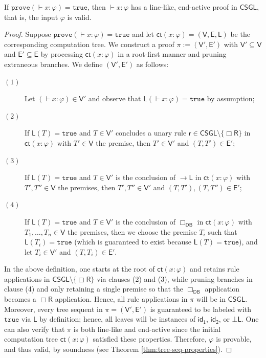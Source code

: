 \documentclass[copyright,creativecommons]{eptcs}
\newcommand{\idi}{\mathsf{id_{1}}}
\newcommand{\idii}{\mathsf{id_{2}}}
\newcommand{\boxr}{\Box\mathsf{R}}
\renewcommand{\phi}{\varphi}
\newcommand{\ctrl}{\mathsf{cL}}
\newcommand{\ctrr}{\mathsf{cR}}
\newcommand{\prf}{\pi}
\newcommand{\ru}{\mathsf{r}}
\newenvironment{customthm}[1]
  {\renewcommand\theinnercustomthm{#1}\innercustomthm}
  {\endinnercustomthm}
\newcommand{\calc}{\mathsf{CSGL}}
\newcommand{\sar}{\vdash}
\newcommand{\tseq}{T} %
\newcommand{\true}{\mathtt{true}}
\newcommand{\prove}{\mathtt{prove}}
\newcommand{\dbr}{\Box_\mathsf{DB}}
\newcommand{\set}[1]{\{#1\}}
\newcommand{\ct}{\mathsf{ct}}
\newcommand{\ctv}{\mathsf{V}}
\newcommand{\cte}{\mathsf{E}}
\newcommand{\ctl}{\mathsf{L}}
\newcommand{\tval}{\true} %
\newcommand{\impl}{{\rightarrow}\mathsf{L}}
\newcommand{\botl}{\bot\mathsf{L}}
\begin{document}
\begin{customthm}{\ref{lem:true-gives-proof}}
If $\prove( \sar x : \phi) = \true$, then $\sar x : \phi$ has a line-like, end-active proof in $\calc$, that is, the input $\phi$ is valid.
\end{customthm}

\begin{proof} Suppose $\prove(\sar x : \phi) = \true$ and let $\ct(x : \phi) = (\ctv,\cte,\ctl)$ be the corresponding computation tree. We construct a proof $\prf := (\ctv',\cte')$ with $\ctv' \subseteq \ctv$ and $\cte' \subseteq \cte$ by processing $\ct(x : \phi)$ in a root-first manner and pruning extraneous branches. We define $(\ctv',\cte')$ as follows:
\begin{description}

\item[$(1)$] Let $( \sar x : \phi) \in \ctv'$ and observe that $\ctl( \sar x : \phi) = \tval$ by assumption;

\item[$(2)$] If $\ctl(\tseq) = \tval$ and $\tseq \in \ctv'$ concludes a unary rule $ \ru \in \calc \setminus \set{\boxr}$ in $\ct(x : \phi)$ with $\tseq' \in \ctv$ the premise, then $\tseq' \in \ctv'$ and $(\tseq,\tseq') \in \cte'$;

\item[$(3)$] If $\ctl(\tseq) = \tval$ and $\tseq \in \ctv'$ is the conclusion of $\impl$ in $\ct(x : \phi)$ with $\tseq', \tseq'' \in \ctv$ the premises, then $\tseq', \tseq'' \in \ctv'$ and $(\tseq,\tseq'), (\tseq,\tseq'') \in \cte'$;

\item[$(4)$] If $\ctl(\tseq) = \tval$ and $\tseq \in \ctv'$ is the conclusion of $\dbr$ in $\ct(x : \phi)$ with $\tseq_{1}, \ldots, \tseq_{n} \in \ctv$ the premises, then we choose the premise $\tseq_{i}$ such that $\ctl(\tseq_{i}) = \tval$ (which is guaranteed to exist because $\ctl(\tseq) = \tval$), and let $\tseq_{i} \in \ctv'$ and $(\tseq,\tseq_{i}) \in \cte'$.

\end{description}
In the above definition, one starts at the root of $\ct(x : \phi)$ and retains rule applications in $\calc \setminus \set{\boxr}$ via clauses (2) and (3), while pruning branches in clause (4) and only retaining a single premise so that the $\dbr$ application becomes a $\boxr$ application. %
Hence, all rule applications in $\prf$ will be in $\calc$. Moreover, every tree sequent in $\prf = (\ctv',\cte')$ is guaranteed to be labeled with $\tval$ via $\ctl$ by definition; hence, all leaves will be instances of $\idi$, $\idii$, or $\botl$. One can also verify that $\prf$ is both line-like and end-active since the initial computation tree $\ct(x : \phi)$ satisfied these properties. %
Therefore, $\phi$ is provable, and thus valid, by soundness (see Theorem \ref{thm:tree-seq-properties}).
\end{proof}
\end{document}
